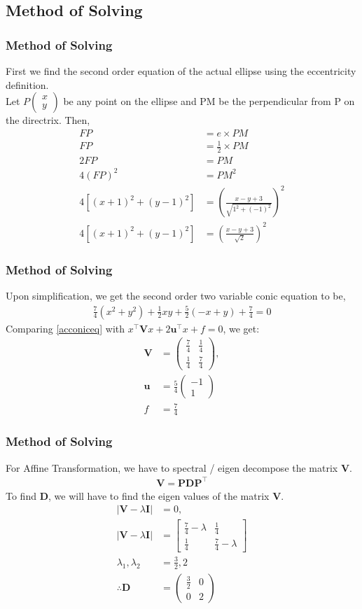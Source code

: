 \documentclass{beamer}
\providecommand{\sbrak}[1]{\ensuremath{{}\left[#1\right]}}
\providecommand{\brak}[1]{\ensuremath{\left(#1\right)}}
\theoremstyle{remark}
\newcommand{\myvec}[1]{\ensuremath{\begin{pmatrix}#1\end{pmatrix}}}
\let\vec\mathbf
\numberwithin{equation}{section}
\begin{document}
\subsection{Method of Solving}
\begin{frame}
	\frametitle{Method of Solving}
First we find the second order equation of the actual ellipse using the eccentricity definition.\\Let \(P\myvec{x\\y}\) be any point on the ellipse and PM be the perpendicular from P on the directrix. Then,
\begin{align}
	FP &= e \times PM\\
	FP &= \frac{1}{2} \times PM\\
	2FP &= PM\\
	4(FP)^2 &= PM^2\\
	4\sbrak{\brak{x+1}^2 + \brak{y-1}^2} &= \brak{\frac{x - y + 3}{\sqrt{1^2 + (-1)^2}}}^2\\
	4\sbrak{\brak{x+1}^2 + \brak{y-1}^2}  &= \brak{\frac{x - y + 3}{\sqrt{2}}}^2
\end{align}
\end{frame}
\begin{frame}
	\frametitle{Method of Solving}
	Upon simplification, we get the second order two variable conic equation to be,
	\begin{align}
		\frac{7}{4}\brak{x^2+y^2} + \frac{1}{2}xy + \frac{5}{2}\brak{-x+y} + \frac{7}{4} = 0 \label{acconiceq}
	\end{align}
	Comparing \eqref{acconiceq} with $x^\top\vec{V}x + 2\vec{u}^\top x + f = 0$, we get:
	\begin{align}
		\vec{V} &= \myvec{\frac{7}{4} & \frac{1}{4} \\ \frac{1}{4} & \frac{7}{4}} ,
		\\
		\vec{u} &=\frac{5}{4}  \myvec{ -1 \\ 1}
		\\
		f &= \frac{7}{4}
	\end{align}
\end{frame}
\begin{frame}
	\frametitle{Method of Solving}
	For Affine Transformation, we have to spectral / eigen decompose the matrix $\vec{V}$. \\ 
	\begin{align}
		\vec{V} = \vec{P}\vec{D}\vec{P^\top}
	\end{align}
	To find $\vec{D}$, we will have to find the eigen values of the matrix $\vec{V}$.
	\begin{align}
		|\vec{V}  - \lambda\vec{I}|  &= 0,\\
		|\vec{V}  - \lambda\vec{I}|  &= \begin{bmatrix}\frac{7}{4} - \lambda& \frac{1}{4}\\ \frac{1}{4} & \frac{7}{4} - \lambda\end{bmatrix}\\
		\lambda_1, \lambda_2 &= \frac{3}{2} , 2\\
		\therefore 	\vec{D} &= \myvec{\frac{3}{2} & 0 \\ 0 & 2	} \label{Ddef}
	\end{align}
\end{frame}
\end{document}
